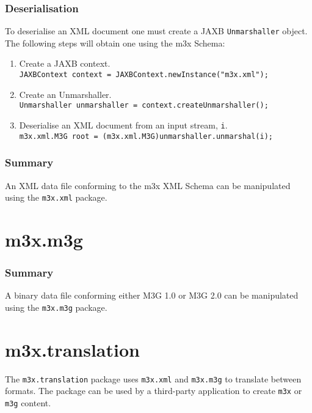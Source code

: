 \subsubsection{Deserialisation}
To deserialise an XML document one must create a JAXB \texttt{Unmarshaller} object. The following steps will obtain one using the m3x Schema:
\begin{enumerate}
\item Create a JAXB context.\\\texttt{JAXBContext context = JAXBContext.newInstance("m3x.xml");}
\item Create an Unmarshaller.\\\texttt{Unmarshaller unmarshaller = context.createUnmarshaller();}
\item Deserialise an XML document from an input stream, \texttt{i}.\\\texttt{m3x.xml.M3G root = (m3x.xml.M3G)unmarshaller.unmarshal(i);}
\end{enumerate}


\subsubsection{Summary}
An XML data file conforming to the m3x XML Schema can be manipulated using the \texttt{m3x.xml} package.




\section{m3x.m3g}

\subsubsection{Summary}
A binary data file conforming either M3G 1.0 or M3G 2.0 can be manipulated using the \texttt{m3x.m3g} package.


\section{m3x.translation}
The \texttt{m3x.translation} package uses \texttt{m3x.xml} and \texttt{m3x.m3g} to translate between formats. The package can be used by a third-party application to create \texttt{m3x} or \texttt{m3g} content.

